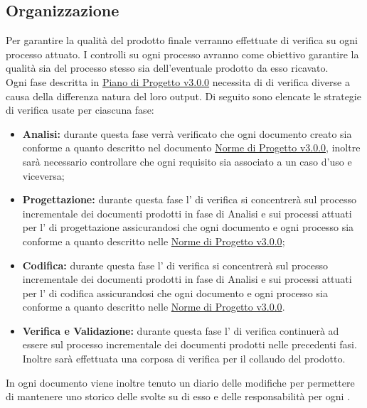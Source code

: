 \documentclass{scalatekids-article}
\begin{document}
\subsection{Organizzazione}
Per garantire la qualità del prodotto finale verranno effettuate  di verifica su ogni processo attuato. I controlli su ogni processo avranno come obiettivo garantire la qualità sia del processo stesso sia dell'eventuale prodotto da esso ricavato.\\
Ogni fase descritta in \href{run:./PianoDiProgetto\_v3.0.0.pdf}{Piano di Progetto v3.0.0} necessita di  di verifica diverse a causa della differenza natura del loro output. Di seguito sono elencate le strategie di verifica usate per ciascuna fase:
\begin{itemize}
\item\textbf{Analisi:} durante questa fase verrà verificato che ogni documento creato sia conforme a quanto descritto nel documento \href{run:../Interni/NormeDiProgetto\_v3.0.0.pdf}{Norme di Progetto v3.0.0}, inoltre sarà necessario controllare che ogni requisito sia associato a un caso d'uso e viceversa;
\item\textbf{Progettazione:} durante questa fase l' di verifica si concentrerà sul processo incrementale dei documenti prodotti in fase di Analisi e sui processi attuati per l' di progettazione assicurandosi che ogni documento e ogni processo sia conforme a quanto descritto nelle \href{run:../Interni/NormeDiProgetto\_v3.0.0.pdf}{Norme di Progetto v3.0.0};
\item\textbf{Codifica:} durante questa fase l' di verifica si concentrerà sul processo incrementale dei documenti prodotti in fase di Analisi e sui processi attuati per l' di codifica assicurandosi che ogni documento e ogni processo sia conforme a quanto descritto nelle \href{run:../Interni/NormeDiProgetto\_v3.0.0.pdf}{Norme di Progetto v3.0.0}.
\item\textbf{Verifica e Validazione:} durante questa fase l' di verifica continuerà ad essere sul processo incrementale dei documenti prodotti nelle precedenti fasi. Inoltre sarà effettuata una corposa  di verifica per il collaudo del prodotto.
\end{itemize}
In ogni documento viene inoltre tenuto un diario delle modifiche per permettere di mantenere uno storico delle  svolte su di esso e delle responsabilità per ogni .
\end{document}
